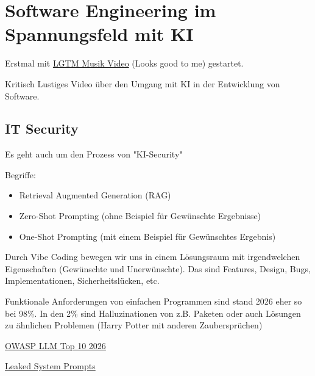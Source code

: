 \documentclass[a4paper]{article}
\title{\docTitle}
\author{Moritz}
\date{\today}
\begin{document}
\maketitle
\tableofcontents


\section{Software Engineering im Spannungsfeld mit KI}

Erstmal mit \href{https://www.youtube.com/watch?v=3TNpOD6bov8}{LGTM Musik Video} (Looks good to me) gestartet.

Kritisch Lustiges Video über den Umgang mit KI in der Entwicklung von Software.

\subsection{IT Security}

Es geht auch um den Prozess von "KI-Security"

Begriffe:

\begin{itemize}
    \item Retrieval Augmented Generation (RAG)
    \item Zero-Shot Prompting (ohne Beispiel für Gewünschte Ergebnisse)
    \item One-Shot Prompting (mit einem Beispiel für Gewünschtes Ergebnis)
\end{itemize}

Durch Vibe Coding bewegen wir uns in einem Lösungsraum mit irgendwelchen Eigenschaften (Gewünschte und Unerwünschte). Das sind Features, Design, Bugs, Implementationen, Sicherheitslücken, etc.

Funktionale Anforderungen von einfachen Programmen sind stand 2026 eher so bei 98\%. In den 2\% sind Halluzinationen von z.B. Paketen oder auch Lösungen zu ähnlichen Problemen (Harry Potter mit anderen Zaubersprüchen)


\href{https://genai.owasp.org/resource/owasp-genai-llm-top-10-2026/}{OWASP LLM Top 10 2026}

\href{https://github.com/asgeirtj/system_prompts_leaks}{Leaked System Prompts}
\end{document}
